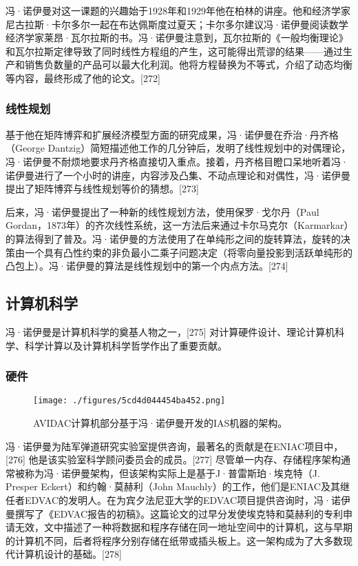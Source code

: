 冯·诺伊曼对这一课题的兴趣始于1928年和1929年他在柏林的讲座。他和经济学家尼古拉斯·卡尔多尔一起在布达佩斯度过夏天；卡尔多尔建议冯·诺伊曼阅读数学经济学家莱昂·瓦尔拉斯的书。冯·诺伊曼注意到，瓦尔拉斯的《一般均衡理论》和瓦尔拉斯定律导致了同时线性方程组的产生，这可能得出荒谬的结果——通过生产和销售负数量的产品可以最大化利润。他将方程替换为不等式，介绍了动态均衡等内容，最终形成了他的论文。[272]
\subsubsection{线性规划}  
基于他在矩阵博弈和扩展经济模型方面的研究成果，冯·诺伊曼在乔治·丹齐格（George Dantzig）简短描述他工作的几分钟后，发明了线性规划中的对偶理论，冯·诺伊曼不耐烦地要求丹齐格直接切入重点。接着，丹齐格目瞪口呆地听着冯·诺伊曼进行了一个小时的讲座，内容涉及凸集、不动点理论和对偶性，冯·诺伊曼提出了矩阵博弈与线性规划等价的猜想。[273]

后来，冯·诺伊曼提出了一种新的线性规划方法，使用保罗·戈尔丹（Paul Gordan，1873年）的齐次线性系统，这一方法后来通过卡尔马克尔（Karmarkar）的算法得到了普及。冯·诺伊曼的方法使用了在单纯形之间的旋转算法，旋转的决策由一个具有凸性约束的非负最小二乘子问题决定（将零向量投影到活跃单纯形的凸包上）。冯·诺伊曼的算法是线性规划中的第一个内点方法。[274]
\subsection{计算机科学}  
冯·诺伊曼是计算机科学的奠基人物之一，[275] 对计算硬件设计、理论计算机科学、科学计算以及计算机科学哲学作出了重要贡献。
\subsubsection{硬件}
\begin{figure}[ht]
\centering
\texttt{[image: ./figures/5cd4d044454ba452.png]}
\caption{AVIDAC计算机部分基于冯·诺伊曼开发的IAS机器的架构。} \label{fig_Neuman_7}
\end{figure}
冯·诺伊曼为陆军弹道研究实验室提供咨询，最著名的贡献是在ENIAC项目中，[276] 他是该实验室科学顾问委员会的成员。[277] 尽管单一内存、存储程序架构通常被称为冯·诺伊曼架构，但该架构实际上是基于J·普雷斯珀·埃克特（J. Presper Eckert）和约翰·莫赫利（John Mauchly）的工作，他们是ENIAC及其继任者EDVAC的发明人。在为宾夕法尼亚大学的EDVAC项目提供咨询时，冯·诺伊曼撰写了《EDVAC报告的初稿》。这篇论文的过早分发使埃克特和莫赫利的专利申请无效，文中描述了一种将数据和程序存储在同一地址空间中的计算机，这与早期的计算机不同，后者将程序分别存储在纸带或插头板上。这一架构成为了大多数现代计算机设计的基础。[278]

